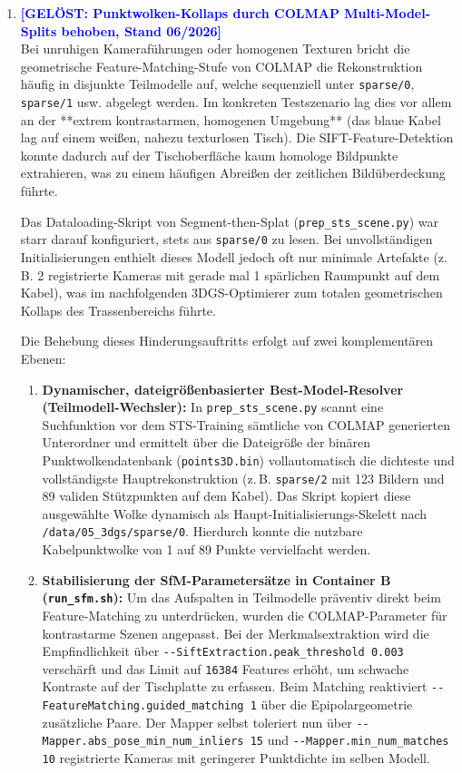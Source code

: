 \documentclass[12pt,a4paper]{article}
\begin{document}
\begin{enumerate}
        \item \textcolor{blue}{\textbf{[GELÖST: Punktwolken-Kollaps durch COLMAP Multi-Model-Splits behoben, Stand 06/2026]}} \\
            Bei unruhigen Kameraführungen oder homogenen Texturen bricht die geometrische Feature-Matching-Stufe von COLMAP die Rekonstruktion häufig in disjunkte Teilmodelle auf, welche sequenziell unter \texttt{sparse/0}, \texttt{sparse/1} usw. abgelegt werden. Im konkreten Testszenario lag dies vor allem an der **extrem kontrastarmen, homogenen Umgebung** (das blaue Kabel lag auf einem weißen, nahezu texturlosen Tisch). Die SIFT-Feature-Detektion konnte dadurch auf der Tischoberfläche kaum homologe Bildpunkte extrahieren, was zu einem häufigen Abreißen der zeitlichen Bildüberdeckung führte.
            
            Das Dataloading-Skript von Segment-then-Splat (\texttt{prep\_sts\_scene.py}) war starr darauf konfiguriert, stets aus \texttt{sparse/0} zu lesen. Bei unvollständigen Initialisierungen enthielt dieses Modell jedoch oft nur minimale Artefakte (z.\,B. 2 registrierte Kameras mit gerade mal 1 spärlichen Raumpunkt auf dem Kabel), was im nachfolgenden 3DGS-Optimierer zum totalen geometrischen Kollaps des Trassenbereichs führte.

            Die Behebung dieses Hinderungsauftritts erfolgt auf zwei komplementären Ebenen:
            \begin{enumerate}
                \item \textbf{Dynamischer, dateigrößenbasierter Best-Model-Resolver (Teilmodell-Wechsler):} In \texttt{prep\_sts\_scene.py} scannt eine Suchfunktion vor dem STS-Training sämtliche von COLMAP generierten Unterordner und ermittelt über die Dateigröße der binären Punktwolkendatenbank (\texttt{points3D.bin}) vollautomatisch die dichteste und vollständigste Hauptrekonstruktion (z.\,B. \texttt{sparse/2} mit 123 Bildern und 89 validen Stützpunkten auf dem Kabel). Das Skript kopiert diese ausgewählte Wolke dynamisch als Haupt-Initialisierungs-Skelett nach \texttt{/data/05\_3dgs/sparse/0}. Hierdurch konnte die nutzbare Kabelpunktwolke von 1 auf 89 Punkte vervielfacht werden.
                \item \textbf{Stabilisierung der SfM-Parametersätze in Container B (\texttt{run\_sfm.sh}):} Um das Aufspalten in Teilmodelle präventiv direkt beim Feature-Matching zu unterdrücken, wurden die COLMAP-Parameter für kontrastarme Szenen angepasst. Bei der Merkmalsextraktion wird die Empfindlichkeit über \texttt{-{}-SiftExtraction.peak\_threshold 0.003} verschärft und das Limit auf \texttt{16384} Features erhöht, um schwache Kontraste auf der Tischplatte zu erfassen. Beim Matching reaktiviert \texttt{-{}-FeatureMatching.guided\_matching 1} über die Epipolargeometrie zusätzliche Paare. Der Mapper selbst toleriert nun über \texttt{-{}-Mapper.abs\_pose\_min\_num\_inliers 15} und \texttt{-{}-Mapper.min\_num\_matches 10} registrierte Kameras mit geringerer Punktdichte im selben Modell.
            \end{enumerate}
            

\end{enumerate}
\end{document}
